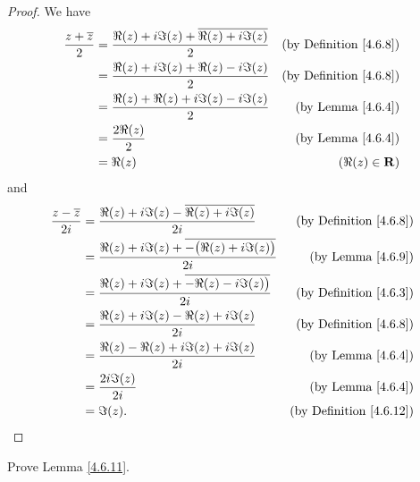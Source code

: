 \begin{proof}
    We have
    \begin{align*}
        \frac{z + \overline{z}}{2} & = \frac{\Re(z) + i \Im(z) + \overline{\Re(z) + i \Im(z)}}{2} & \text{(by Definition \ref{4.6.8})} \\
                                   & = \frac{\Re(z) + i \Im(z) + \Re(z) - i \Im(z)}{2}            & \text{(by Definition \ref{4.6.8})} \\
                                   & = \frac{\Re(z) + \Re(z) + i \Im(z) - i \Im(z)}{2}            & \text{(by Lemma \ref{4.6.4})}      \\
                                   & = \frac{2 \Re(z)}{2}                                         & \text{(by Lemma \ref{4.6.4})}      \\
                                   & = \Re(z)                                                     & (\Re(z) \in \mathbf{R})
    \end{align*}
    and
    \begin{align*}
        \frac{z - \overline{z}}{2i} & = \frac{\Re(z) + i \Im(z) - \overline{\Re(z) + i \Im(z)}}{2i}            & \text{(by Definition \ref{4.6.8})}  \\
                                    & = \frac{\Re(z) + i \Im(z) + \overline{-\big(\Re(z) + i \Im(z)\big)}}{2i} & \text{(by Lemma \ref{4.6.9})}       \\
                                    & = \frac{\Re(z) + i \Im(z) + \overline{-\Re(z) - i \Im(z)\big)}}{2i}      & \text{(by Definition \ref{4.6.3})}  \\
                                    & = \frac{\Re(z) + i \Im(z) - \Re(z) + i \Im(z)}{2i}                       & \text{(by Definition \ref{4.6.8})}  \\
                                    & = \frac{\Re(z) - \Re(z) + i \Im(z) + i \Im(z)}{2i}                       & \text{(by Lemma \ref{4.6.4})}       \\
                                    & = \frac{2i \Im(z)}{2i}                                                   & \text{(by Lemma \ref{4.6.4})}       \\
                                    & = \Im(z).                                                                & \text{(by Definition \ref{4.6.12})}
    \end{align*}
\end{proof}

\begin{exercise}\label{ex 4.6.6}
    Prove Lemma \ref{4.6.11}.
\end{exercise}

